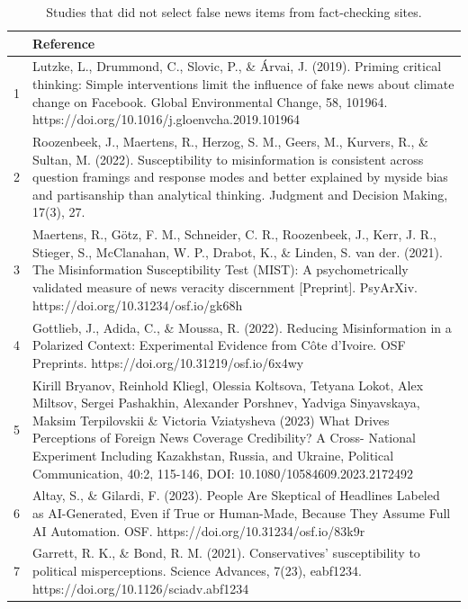 \documentclass[
  man]{apa6}
\begin{document}
\begin{table}[tbp]

\begin{center}
\begin{threeparttable}

\caption{\label{tab:non-fact-check-sites-studies}Studies that did not select false news items from fact-checking sites.}

\scriptsize{

\begin{tabular}{lm{16cm}}
\toprule
 & Reference\\
\midrule
1 & Lutzke, L., Drummond, C., Slovic, P., \& Árvai, J. (2019). Priming critical thinking: Simple interventions limit the influence of fake news about climate change on Facebook. Global Environmental Change, 58, 101964. https://doi.org/10.1016/j.gloenvcha.2019.101964\\
2 & Roozenbeek, J., Maertens, R., Herzog, S. M., Geers, M., Kurvers, R., \& Sultan, M. (2022). Susceptibility to misinformation is consistent across question framings and response modes and better explained by myside bias and partisanship than analytical thinking. Judgment and Decision Making, 17(3), 27.\\
3 & Maertens, R., Götz, F. M., Schneider, C. R., Roozenbeek, J., Kerr, J. R., Stieger, S., McClanahan, W. P., Drabot, K., \& Linden, S. van der. (2021). The Misinformation Susceptibility Test (MIST): A psychometrically validated measure of news veracity discernment [Preprint]. PsyArXiv. https://doi.org/10.31234/osf.io/gk68h\\
4 & Gottlieb, J., Adida, C., \& Moussa, R. (2022). Reducing Misinformation in a Polarized Context: Experimental Evidence from Côte d’Ivoire. OSF Preprints. https://doi.org/10.31219/osf.io/6x4wy\\
5 & Kirill Bryanov, Reinhold Kliegl, Olessia Koltsova, Tetyana Lokot, Alex Miltsov, Sergei Pashakhin, Alexander Porshnev, Yadviga Sinyavskaya, Maksim Terpilovskii \& Victoria Vziatysheva (2023) What Drives Perceptions of Foreign News Coverage Credibility? A Cross- National Experiment Including Kazakhstan, Russia, and Ukraine, Political Communication, 40:2, 115-146, DOI: 10.1080/10584609.2023.2172492\\
6 & Altay, S., \& Gilardi, F. (2023). People Are Skeptical of Headlines Labeled as AI-Generated, Even if True or Human-Made, Because They Assume Full AI Automation. OSF. https://doi.org/10.31234/osf.io/83k9r\\
7 & Garrett, R. K., \& Bond, R. M. (2021). Conservatives’ susceptibility to political misperceptions. Science Advances, 7(23), eabf1234. https://doi.org/10.1126/sciadv.abf1234\\

\end{tabular}}
\end{threeparttable}
\end{center}
\end{table}
\end{document}
